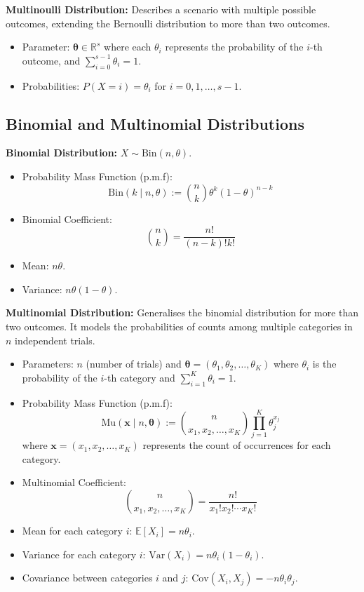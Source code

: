 \textbf{Multinoulli Distribution:} Describes a scenario with multiple possible outcomes, extending the Bernoulli distribution to more than two outcomes.
\begin{itemize}
    \item Parameter: \(\bm{\theta} \in \mathbb{R}^s\) where each \(\theta_i\) represents the probability of the \(i\)-th outcome, and \(\sum_{i=0}^{s-1} \theta_i = 1\).
    \item Probabilities: \(P(X = i) = \theta_i\) for \(i = 0, 1, \ldots, s-1\).
\end{itemize}

\subsection{Binomial and Multinomial Distributions}
\textbf{Binomial Distribution:} \(X \sim \text{Bin}(n, \theta)\).
\begin{itemize}
    \item Probability Mass Function (p.m.f):
    \[
    \text{Bin}(k \mid n, \theta) := \binom{n}{k} \theta^k (1 - \theta)^{n-k}
    \]
    \item Binomial Coefficient:
    \[
    \binom{n}{k} = \frac{n!}{(n - k)!k!}
    \]
    \item Mean: \(n\theta\).
    \item Variance: \(n\theta(1 - \theta)\).
\end{itemize}

\textbf{Multinomial Distribution:} Generalises the binomial distribution for more than two outcomes. It models the probabilities of counts among multiple categories in \(n\) independent trials.
\begin{itemize}
    \item Parameters: \(n\) (number of trials) and \(\boldsymbol{\theta} = (\theta_1, \theta_2, \ldots, \theta_K)\) where \(\theta_i\) is the probability of the \(i\)-th category and \(\sum_{i=1}^{K} \theta_i = 1\).
    \item Probability Mass Function (p.m.f):
    \[
    \text{Mu}(\mathbf{x} \mid n, \boldsymbol{\theta}) := \binom{n}{x_1, x_2, \ldots, x_K} \prod_{j=1}^{K} \theta_j^{x_j}
    \]
    where \(\mathbf{x} = (x_1, x_2, \ldots, x_K)\) represents the count of occurrences for each category.
    \item Multinomial Coefficient:
    \[
    \binom{n}{x_1, x_2, \ldots, x_K} = \frac{n!}{x_1! x_2! \cdots x_K!}
    \]
    \item Mean for each category \(i\): \(\mathbb{E}[X_i] = n\theta_i\).
    \item Variance for each category \(i\): \(\text{Var}(X_i) = n\theta_i(1 - \theta_i)\).
    \item Covariance between categories \(i\) and \(j\): \(\text{Cov}(X_i, X_j) = -n\theta_i\theta_j\).
\end{itemize}


